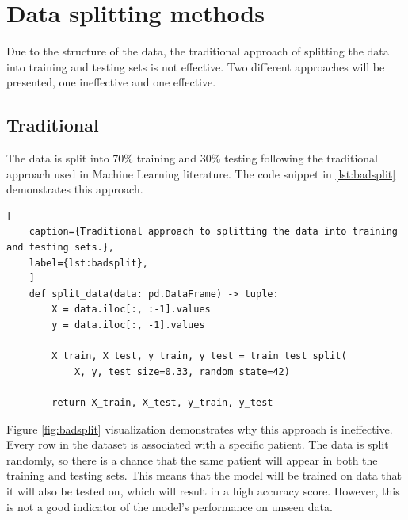     \newpage
        
        
    \section{Data splitting methods}
        
            Due to the structure of the data, the traditional approach of splitting the data into training and testing sets is not effective. Two different approaches will be presented, one ineffective and one effective.

            \subsection{Traditional} \label{sec:badsplit}
                        
                    The data is split into 70\% training and 30\% testing following the traditional approach used in Machine Learning literature. The code snippet in \ref{lst:badsplit} demonstrates this approach. 
            
\begin{lstlisting}[
    caption={Traditional approach to splitting the data into training and testing sets.}, 
    label={lst:badsplit},
    ]            
    def split_data(data: pd.DataFrame) -> tuple:        
        X = data.iloc[:, :-1].values
        y = data.iloc[:, -1].values
        
        X_train, X_test, y_train, y_test = train_test_split(
            X, y, test_size=0.33, random_state=42)
        
        return X_train, X_test, y_train, y_test
\end{lstlisting}
                
                    Figure \ref{fig:badsplit} visualization demonstrates why this approach is ineffective. Every row in the dataset is associated with a specific patient. The data is split randomly, so there is a chance that the same patient will appear in both the training and testing sets. This means that the model will be trained on data that it will also be tested on, which will result in a high accuracy score. However, this is not a good indicator of the model's performance on unseen data.

